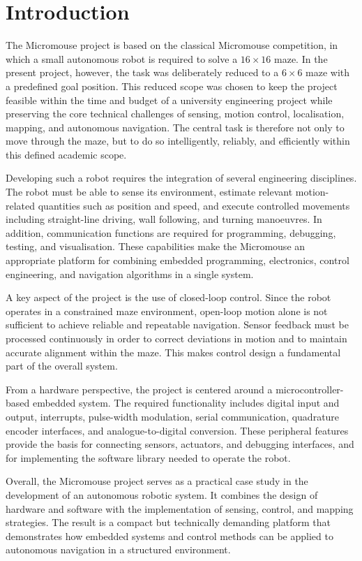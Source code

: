 \section{Introduction}
The Micromouse project is based on the classical Micromouse competition, in which a small autonomous robot is required to solve a $16 \times 16$ maze. In the present project, however, the task was deliberately reduced to a $6 \times 6$ maze with a predefined goal position. This reduced scope was chosen to keep the project feasible within the time and budget of a university engineering project while preserving the core technical challenges of sensing, motion control, localisation, mapping, and autonomous navigation. The central task is therefore not only to move through the maze, but to do so intelligently, reliably, and efficiently within this defined academic scope.

Developing such a robot requires the integration of several engineering disciplines. The robot must be able to sense its environment, estimate relevant motion-related quantities such as position and speed, and execute controlled movements including straight-line driving, wall following, and turning manoeuvres. In addition, communication functions are required for programming, debugging, testing, and visualisation. These capabilities make the Micromouse an appropriate platform for combining embedded programming, electronics, control engineering, and navigation algorithms in a single system.

A key aspect of the project is the use of closed-loop control. Since the robot operates in a constrained maze environment, open-loop motion alone is not sufficient to achieve reliable and repeatable navigation. Sensor feedback must be processed continuously in order to correct deviations in motion and to maintain accurate alignment within the maze. This makes control design a fundamental part of the overall system.

From a hardware perspective, the project is centered around a microcontroller-based embedded system. The required functionality includes digital input and output, interrupts, pulse-width modulation, serial communication, quadrature encoder interfaces, and analogue-to-digital conversion. These peripheral features provide the basis for connecting sensors, actuators, and debugging interfaces, and for implementing the software library needed to operate the robot.

Overall, the Micromouse project serves as a practical case study in the development of an autonomous robotic system. It combines the design of hardware and software with the implementation of sensing, control, and mapping strategies. The result is a compact but technically demanding platform that demonstrates how embedded systems and control methods can be applied to autonomous navigation in a structured environment.


